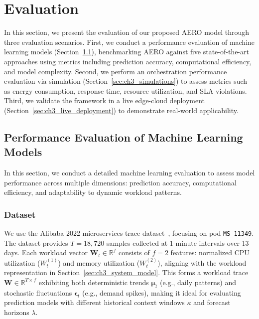 \section{Evaluation}

In this section, we present the evaluation of our proposed \ac{AERO} model through three evaluation scenarios. First, we conduct a performance evaluation of machine learning models (Section~\ref{sec:ch3_evaluation}), benchmarking \ac{AERO} against five state-of-the-art approaches using metrics including prediction accuracy, computational efficiency, and model complexity. Second, we perform an orchestration performance evaluation via simulation (Section~\ref{sec:ch3_simulations}) to assess metrics such as energy consumption, response time, resource utilization, and \ac{SLA} violations. Third, we validate the framework in a live edge-cloud deployment (Section~\ref{sec:ch3_live_deployment}) to demonstrate real-world applicability.

\subsection{Performance Evaluation of Machine Learning Models}
\label{sec:ch3_evaluation}

In this section, we conduct a detailed machine learning evaluation to assess model performance across multiple dimensions: prediction accuracy, computational efficiency, and adaptability to dynamic workload patterns.

\subsubsection{Dataset}

We use the Alibaba 2022 microservices trace dataset~\cite{luo2022Prediction}, focusing on pod \texttt{MS\_11349}. The dataset provides $T = 18,\!720$ samples collected at 1-minute intervals over 13 days. Each workload vector $\mathbf{W}_t \in \mathbb{R}^{f}$ consists of $f = 2$ features: normalized \ac{CPU} utilization ($W_t^{(1)}$) and memory utilization ($W_t^{(2)}$), aligning with the workload representation in Section~\ref{sec:ch3_system_model}. This forms a workload trace $\mathbf{W} \in \mathbb{R}^{T \times f}$ exhibiting both deterministic trends $\boldsymbol{\mu}_t$ (e.g., daily patterns) and stochastic fluctuations $\boldsymbol{\epsilon}_t$ (e.g., demand spikes), making it ideal for evaluating prediction models with different historical context windows $\kappa$ and forecast horizons $\lambda$.

